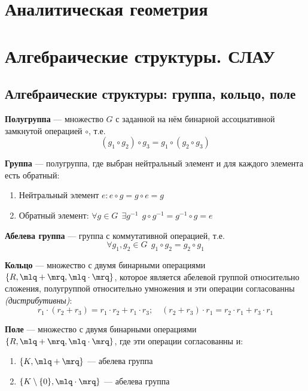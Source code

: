 \section{Аналитическая геометрия}

\section{Алгебраические структуры. СЛАУ}
\subsection{Алгебраические структуры: группа, кольцо, поле}
\begin{definition}
    \textbf{Полугруппа} --- множество $G$ с заданной на нём бинарной ассоциативной замкнутой операцией $\circ$, т.е. $$(g_1\circ g_2)\circ g_3 = g_1\circ (g_2 \circ g_3)$$
\end{definition}
\begin{definition}
    \textbf{Группа} --- полугруппа, где выбран нейтральный элемент и для каждого элемента есть обратный:
    \begin{enumerate}
        \item Нейтральный элемент $e: e\circ g=g\circ e=g$
        \item Обратный элемент: $\forall g\in G \ \ \exists g^{-1} \ \ g\circ g^{-1}=g^{-1}\circ g=e$
    \end{enumerate}
\end{definition}
\begin{definition}
    \textbf{Абелева группа} --- группа с коммутативной операцией, т.е. $$\forall g_1, g_2\in G \ \ g_1\circ g_2=g_2\circ g_1$$
\end{definition}
\begin{definition}
    \textbf{Кольцо} --- множество с двумя бинарными операциями $\{R, \mlq+\mrq, \mlq\cdot\mrq\}$, которое является абелевой группой относительно сложения, полугруппой относительно умножения и эти операции согласованны \textit{(дистрибутивны)}:
    $$r_1\cdot(r_2+r_3)=r_1\cdot r_2+r_1\cdot r_3;\quad (r_2+r_3)\cdot r_1=r_2\cdot r_1+r_3\cdot r_1$$
\end{definition}
\begin{definition}
    \textbf{Поле} --- множество с двумя бинарными операциями $\{R, \mlq+\mrq, \mlq\cdot\mrq\}$, где эти операции согласованны и:
    \begin{enumerate}
        \item $\{K, \mlq + \mrq\}$ --- абелева группа
        \item $\{K\setminus\{0\}, \mlq \cdot \mrq\}$ --- абелева группа
    \end{enumerate}
\end{definition}
